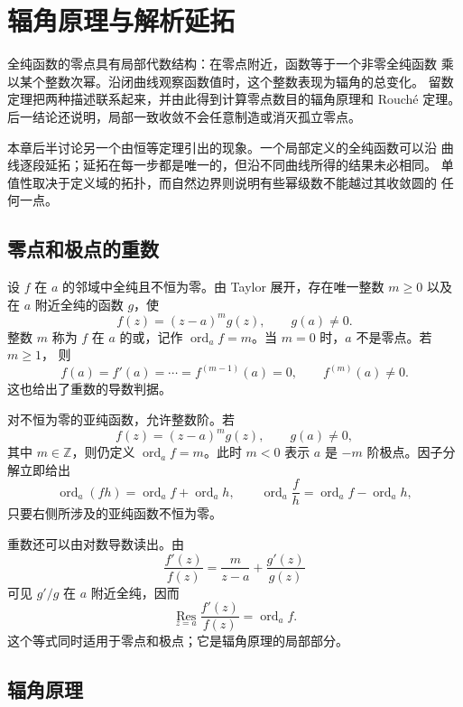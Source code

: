 \chapter{辐角原理与解析延拓}
\label{chap:argument-principle-analytic-continuation}

全纯函数的零点具有局部代数结构：在零点附近，函数等于一个非零全纯函数
乘以某个整数次幂。沿闭曲线观察函数值时，这个整数表现为辐角的总变化。
留数定理把两种描述联系起来，并由此得到计算零点数目的辐角原理和
Rouché 定理。后一结论还说明，局部一致收敛不会任意制造或消灭孤立零点。

本章后半讨论另一个由恒等定理引出的现象。一个局部定义的全纯函数可以沿
曲线逐段延拓；延拓在每一步都是唯一的，但沿不同曲线所得的结果未必相同。
单值性取决于定义域的拓扑，而自然边界则说明有些幂级数不能越过其收敛圆的
任何一点。

\section{零点和极点的重数}

设 $f$ 在 $a$ 的邻域中全纯且不恒为零。由 Taylor 展开，存在唯一整数
$m\ge 0$ 以及在 $a$ 附近全纯的函数 $g$，使
\[
 f(z)=(z-a)^m g(z),\qquad g(a)\ne0.
\]
整数 $m$ 称为 $f$ 在 $a$ 的或，记作
$\operatorname{ord}_a f=m$。当 $m=0$ 时，$a$ 不是零点。若 $m\ge1$，
则
\[
 f(a)=f'(a)=\cdots=f^{(m-1)}(a)=0,
 \qquad f^{(m)}(a)\ne0.
\]
这也给出了重数的导数判据。

对不恒为零的亚纯函数，允许整数阶。若
\[
 f(z)=(z-a)^m g(z),\qquad g(a)\ne0,
\]
其中 $m\in\mathbb Z$，则仍定义 $\operatorname{ord}_a f=m$。此时
$m<0$ 表示 $a$ 是 $-m$ 阶极点。因子分解立即给出
\[
 \operatorname{ord}_a(fh)=\operatorname{ord}_a f+
 \operatorname{ord}_a h,
 \qquad
 \operatorname{ord}_a\frac f h=\operatorname{ord}_a f-
 \operatorname{ord}_a h,
\]
只要右侧所涉及的亚纯函数不恒为零。

重数还可以由对数导数读出。由
\[
 \frac{f'(z)}{f(z)}=\frac{m}{z-a}+\frac{g'(z)}{g(z)}
\]
可见 $g'/g$ 在 $a$ 附近全纯，因而
\begin{equation}\label{eq:logarithmic-derivative-residue}
 \operatorname*{Res}_{z=a}\frac{f'(z)}{f(z)}
 =\operatorname{ord}_a f.
\end{equation}
这个等式同时适用于零点和极点；它是辐角原理的局部部分。

\section{辐角原理}

